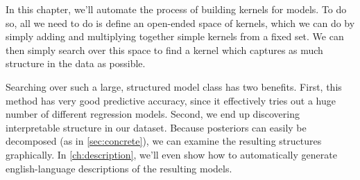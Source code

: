 In this chapter, we'll automate the process of building kernels for \gp{} models.
%
To do so, all we need to do is define an open-ended space of kernels, which we can do by simply adding and multiplying together simple kernels from a fixed set.
We can then simply search over this space to find a kernel which captures as much structure in the data as possible.


Searching over such a large, structured model class has two benefits.
First, this method has very good predictive accuracy, since it effectively tries out a huge number of different regression models.
Second, we end up discovering interpretable structure in our dataset.
Because \gp{} posteriors can easily be decomposed (as in \cref{sec:concrete}), we can examine the resulting structures graphically.
In \cref{ch:description}, we'll even show how to automatically generate english-language descriptions of the resulting models.





